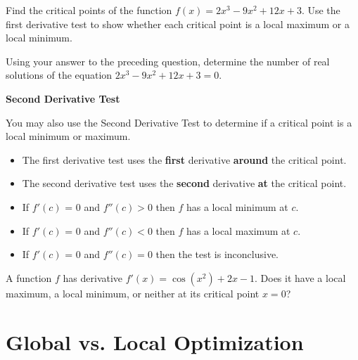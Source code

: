 \newpage

\problem Find the critical points of the function $f(x) = 2 x^3 - 9
  x^2 + 12 x +3$.  Use the first derivative test to show whether each
  critical point is a local maximum or a local minimum.

\vfill
\vfill

\newpage 

Using your answer to the preceding question, determine
  the number of real solutions of the equation $2 x^3 - 9 x^2 + 12 x +
  3 = 0$.

\vfill

\newpage 
\begin{boxnote}
{\bf Second Derivative Test}

You may also use the Second Derivative Test to determine if a critical
point is a local minimum or maximum.  
\begin{itemize}
\item The first derivative test uses the {\bf first} derivative {\bf
    around} the critical point.
\item The second derivative test uses the {\bf second} derivative {\bf at} the critical point.
\end{itemize}
\begin{itemize}
\item If $f'(c)$ = 0 and $f''(c) > 0$ then $f$ has a local minimum at $c$. \notesonly{\\[1.0in]}\largeall{\\[0.8in]}
\item If $f'(c)$ = 0 and $f''(c) < 0$ then $f$ has a local maximum at $c$. \notesonly{\\[1.0in]}\largeall{\\[0.8in]}
\item If $f'(c)$ = 0 and $f''(c) = 0$ then the test is inconclusive. \\[0.3in] 
\end{itemize}
\end{boxnote}

\vsc
\newpage
\problem A function $f$ has derivative $f'(x) = \cos(x^2) + 2x - 1$.
  Does it have a local maximum, a local minimum, or neither at its
  critical point $x=0$?

\newpage 

\section*{Global vs. Local Optimization}

